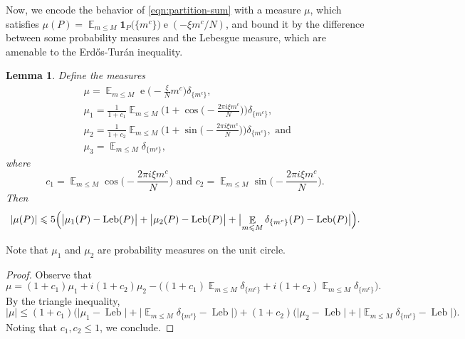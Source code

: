 \documentclass[letterpaper, 12pt]{article}
\theoremstyle{plain}
\newtheorem{Lemma}[Theorem]{Lemma}
\theoremstyle{definition}
\theoremstyle{plain}
\theoremstyle{plain}
\numberwithin{equation}{section}
\newcommand{\Erdos}{Erd\H{o}s}
\newcommand{\Turan}{Tur{\'a}n}
\renewcommand{\leq}{\leqslant}
\newcommand{\E}{\mathbb{E}}
\newcommand{\1}{\textbf{1}}
\DeclareMathOperator{\Leb}{Leb}
\DeclareMathOperator{\e}{e}
\begin{document}
Now, we encode the behavior of \cref{eqn:partition-sum} with a measure $\mu$, which satisfies $\mu(P) = \mathop{\E}_{m \leq M} \1_{P}\bigl(\{m^c\}\bigr) \e(-\xi m^c/N)$, and bound it by the difference between some probability measures and the Lebesgue measure, which are amenable to the \Erdos-\Turan{} inequality.

\begin{Lemma}\label{lem:measure-stuff} 
    Define the measures
    \begin{align*}
        &\mu = \!\! \mathop{\E}_{m \leq M} \e\biggl(\! -\frac{\xi}{N} m^c \biggr) \delta_{\{m^c\}},\\ 
        &\mu_1 = \frac{1}{1 + c_1}\mathop{\E}_{m\leq M} \biggl(1 + \cos\biggl(\! -\frac{2 \pi i \xi m^c}{N} \biggr) \biggr)\delta_{\{m^c\}},\\
        &\mu_2 = \frac{1}{1 + c_2}\mathop{\E}_{m \leq M}\biggl(1 + \sin\biggl(\! -\frac{2 \pi i \xi m^c}{N}\biggr)\biggr)\delta_{\{m^c\}}, \text{ and } \\
        &\mu_3 = \!\! \mathop{\E}_{m \leq M} \delta_{\{m^c\}},
    \end{align*}
    where
    \begin{equation*}
        c_1 = \!\! \mathop{\E}_{m \leq M} \cos\biggl(\! -\frac{2\pi i \xi m^c}{N} \biggr) \text{ and } 
        c_2 = \!\! \mathop{\E}_{m \leq M} \sin\biggl(\! -\frac{2\pi i \xi m^c}{N}\biggr).
    \end{equation*}
    Then
    \begin{equation*}
        \lvert \mu(P) \rvert \leq 5 \Bigl(\bigl\lvert \mu_1(P) - \Leb(P) \bigr\rvert +  \bigl\lvert \mu_2(P) - \Leb(P) \bigr\rvert + \bigl\lvert \mathop{\E}_{m \leq M} \delta_{\{m^c\}}(P) - \Leb(P) \bigr\rvert \Bigr).
    \end{equation*}
\end{Lemma}
Note that $\mu_1$ and $\mu_2$ are probability measures on the unit circle.
\begin{proof}
    Observe that
    \[
        \mu = (1 + c_1)\mu_1 + i(1 + c_2)\mu_2 - \bigl((1 + c_1)\mathop{\E}_{m \leq M} \delta_{\{m^c\}} + i(1 + c_2)\mathop{\E}_{m \leq M}\delta_{\{m^c\}}\bigr).
    \]
    By the triangle inequality,
    \[
        \lvert \mu \rvert \leq (1 + c_1) \bigl(\lvert \mu_1 - \Leb\rvert + \lvert\mathop{\E}_{m \leq M}\delta_{\{m^c\}} - \Leb \rvert \bigr) + (1 + c_2) \bigl(\lvert \mu_2 - \Leb \rvert + \lvert \mathop{\E}_{m \leq M}\delta_{\{m^c\}} - \Leb \rvert \bigr).
    \]
    Noting that $c_1, c_2 \leq 1$, we conclude.
\end{proof}
\end{document}
